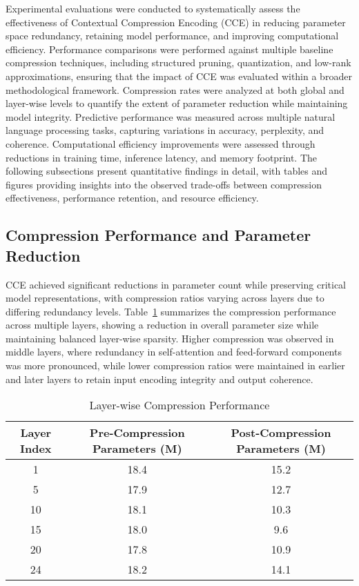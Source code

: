 \documentclass{article}
\begin{document}
Experimental evaluations were conducted to systematically assess the effectiveness of Contextual Compression Encoding (CCE) in reducing parameter space redundancy, retaining model performance, and improving computational efficiency. Performance comparisons were performed against multiple baseline compression techniques, including structured pruning, quantization, and low-rank approximations, ensuring that the impact of CCE was evaluated within a broader methodological framework. Compression rates were analyzed at both global and layer-wise levels to quantify the extent of parameter reduction while maintaining model integrity. Predictive performance was measured across multiple natural language processing tasks, capturing variations in accuracy, perplexity, and coherence. Computational efficiency improvements were assessed through reductions in training time, inference latency, and memory footprint. The following subsections present quantitative findings in detail, with tables and figures providing insights into the observed trade-offs between compression effectiveness, performance retention, and resource efficiency. 

\subsection{Compression Performance and Parameter Reduction}

CCE achieved significant reductions in parameter count while preserving critical model representations, with compression ratios varying across layers due to differing redundancy levels. Table~\ref{tab:compression_rates} summarizes the compression performance across multiple layers, showing a reduction in overall parameter size while maintaining balanced layer-wise sparsity. Higher compression was observed in middle layers, where redundancy in self-attention and feed-forward components was more pronounced, while lower compression ratios were maintained in earlier and later layers to retain input encoding integrity and output coherence.

\begin{table}[t]
	\centering
	\caption{Layer-wise Compression Performance}
	\label{tab:compression_rates}
		\begin{tabular}{ccc}
			\hline
			\textbf{Layer Index} & \textbf{Pre-Compression Parameters (M)} & \textbf{Post-Compression Parameters (M)} \\
			\hline
			1  & 18.4 & 15.2 \\
			5  & 17.9 & 12.7 \\
			10 & 18.1 & 10.3 \\
			15 & 18.0 & 9.6  \\
			20 & 17.8 & 10.9 \\
			24 & 18.2 & 14.1 \\
			\hline
		\end{tabular}%
\end{table}
\end{document}
